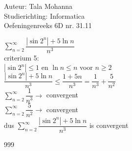 \documentclass[a4paper]{article}
\begin{document}
\noindent \large Auteur: Tala Mohanna \\
\noindent \large Studierichting: Informatica\\
\noindent \large Oefeningenreeks 6D nr. 31.11\\

\medskip

\normalsize

$\displaystyle\sum\limits_{n=2}^{\infty} \dfrac{|\sin 2^n|+5\ln n}{n^3}$\\

criterium 5:\\

$|\sin 2^n|\leq 1$ en $\ln n \leq n$ voor $n\geq 2$\\

$\displaystyle \dfrac{|\sin 2^n|+5\ln n}{n^3} \leq \dfrac{1+5n}{n^3} = \dfrac{1}{n^3}+\dfrac{5}{n^2}$\\

$\displaystyle\sum\limits_{n=2}^{\infty}\dfrac{1}{n^3} \rightarrow$ convergent\\

$\displaystyle\sum\limits_{n=2}^{\infty}\dfrac{5}{n^2} \rightarrow$ convergent\\

dus $\displaystyle\sum\limits_{n=2}^{\infty} \dfrac{|\sin 2^n|+5\ln n}{n^3}$ is convergent\\

\begin{thebibliography}{999}
\end{thebibliography}
\end{document}
